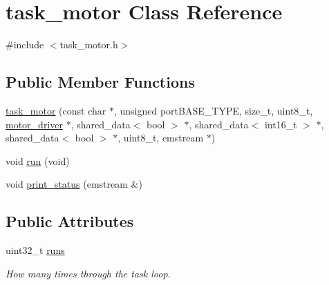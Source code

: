 \hypertarget{classtask__motor}{\section{task\-\_\-motor \-Class \-Reference}
\label{classtask__motor}
}


{\ttfamily \#include $<$task\-\_\-motor.\-h$>$}

\subsection*{\-Public \-Member \-Functions}
\begin{DoxyCompactItemize}
\item 
\hyperlink{classtask__motor_a94cd580f333660de457fdc5c2bd5702e}{task\-\_\-motor} (const char $\ast$, unsigned port\-B\-A\-S\-E\-\_\-\-T\-Y\-P\-E, size\-\_\-t, uint8\-\_\-t, \hyperlink{classmotor__driver}{motor\-\_\-driver} $\ast$, shared\-\_\-data$<$ bool $>$ $\ast$, shared\-\_\-data$<$ int16\-\_\-t $>$ $\ast$, shared\-\_\-data$<$ bool $>$ $\ast$, uint8\-\_\-t, emstream $\ast$)
\item 
void \hyperlink{classtask__motor_a895a075ec470c9d5a07b8959de06aacd}{run} (void)
\item 
void \hyperlink{classtask__motor_ae855a78d1ee432a797d401a9222c9955}{print\-\_\-status} (emstream \&)
\end{DoxyCompactItemize}
\subsection*{\-Public \-Attributes}
\begin{DoxyCompactItemize}
\item 
\hypertarget{classtask__motor_a54a068b1d4cb46dba17d3de8d17fc87c}{uint32\-\_\-t \hyperlink{classtask__motor_a54a068b1d4cb46dba17d3de8d17fc87c}{runs}}\label{classtask__motor_a54a068b1d4cb46dba17d3de8d17fc87c}

\begin{DoxyCompactList}\small\item\em \-How many times through the task loop. \end{DoxyCompactList}\end{DoxyCompactItemize}
